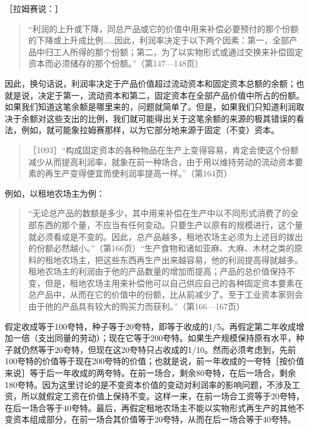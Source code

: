 ［拉姆赛说：］

\begin{quote}{“利润的上升或下降，同总产品或它的价值中用来补偿必要预付的那个份额的下降或上升成比例……因此，利润率决定于以下两个因素：第一，全部产品中归工人所得的那个份额；第二，为了以实物形式或通过交换来补偿固定资本而必须储存的那个份额。”（第147—148页）}\end{quote}

因此，换句话说，利润率决定于产品价值超过流动资本和固定资本总额的余额；也就是说，决定于第一，流动资本和第二，固定资本在全部产品价值中所占的份额。如果我们知道这笔余额是哪里来的，问题就简单了。但是，如果我们只知道利润取决于余额对这些支出的比例，我们就可能得出关于这笔余额的来源的极其错误的看法，例如，就可能象拉姆赛那样，以为它部分地来源于固定（不变）资本。

\begin{quote}{［1093］“构成固定资本的各种物品在生产上变得容易，肯定会使这个份额减少从而提高利润率，就象在前一种场合，由于用以维持劳动的流动资本要素的再生产变得便宜而使利润率提高一样。”（第164页）}\end{quote}

例如，以租地农场主为例：

\begin{quote}{“无论总产品的数额是多少，其中用来补偿在生产中以不同形式消费了的全部东西的那个量，不应当有任何变动。只要生产以原有的规模进行，这个量就必须看成是不变的。因此，总产品越多，租地农场主必须为上述目的拨出的份额必然越小。”（第166页）“生产食物和诸如亚麻、大麻、木材之类的原料的租地农场主，把这些东西再生产出来越容易，他的利润提高得就越多。租地农场主的利润由于他的产品数量的增加而提高；产品的总价值保持不变，但是，租地农场主用来补偿他可以自己供应自己的各种固定资本要素在总产品中，从而在它的价值中的份额，比从前减少了。至于工业资本家则会由于他的产品具有较大的购买力而获利。”（第166—167页）}\end{quote}

假定收成等于100夸特，种子等于20夸特，即等于收成的1/5。再假定第二年收成增加一倍（支出同量的劳动）；现在它等于200夸特。如果生产规模保持原有水平，种子就仍然等于20夸特，但现在这20夸特只占收成的1/10。然而必须考虑到，先前100夸特的价值等于现在200夸特的价值；也就是说，前一年收成的一夸特［按价值来说］等于后一年收成的两夸特。在前一场合，剩余80夸特，在后一场合，剩余180夸特。因为这里讨论的是不变资本价值的变动对利润率的影响问题，不涉及工资，所以就假定工资在价值上保持不变。这样一来，在前一场合工资等于20夸特，在后一场合等于40夸特。最后，再假定租地农场主不能以实物形式再生产的其他不变资本组成部分，在前一场合其价值等于20夸特，从而在后一场合等于40夸特。

